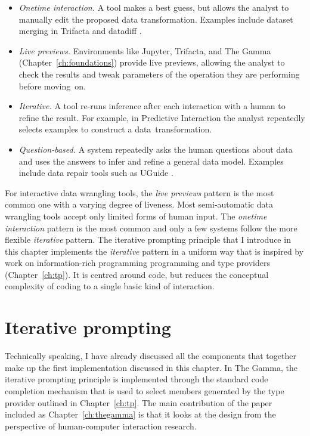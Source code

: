 \documentclass[fleqn,11pt]{report}
\theoremstyle{definition}
\newenvironment{nitemize}
{ \vspace{-0.4em}
  \begin{itemize}
    \setlength{\itemsep}{5pt}
    \setlength{\parskip}{0pt}
    \setlength{\parsep}{0pt} }
{ \end{itemize}
  \vspace{-0.4em} }
\begin{document}
\begin{nitemize}
\item \emph{Onetime interaction.} A tool makes a best guess, but allows the analyst to manually edit
the proposed data transformation. Examples include dataset merging
in Trifacta and datadiff \citep{sutton-2018-datadiff}.

\item \emph{Live previews.} Environments like Jupyter, Trifacta, and The Gamma
(Chapter~\ref{ch:foundations}) provide live previews, allowing the analyst to check the results and tweak
parameters of the operation they are performing before moving~on.

\item \emph{Iterative.} A tool re-runs inference after each interaction with a human
to refine the result. For example, in Predictive Interaction \citep{heer-2015-predictive}
the analyst repeatedly selects examples to construct a data~transformation.

\item \emph{Question-based.} A system repeatedly asks the human questions about data and uses the
answers to infer and refine a general data model. Examples include data repair tools such as UGuide
\citep{thirumuruganathan-2017-uguide}.
\end{nitemize}

For interactive data wrangling tools, the \emph{live previews} pattern is the most common one
with a varying degree of liveness. Most semi-automatic data wrangling tools accept only
limited forms of human input. The \emph{onetime interaction} pattern is the most common
and only a few systems follow the more flexible \emph{iterative} pattern. The iterative
prompting principle that I introduce in this chapter implements the \emph{iterative} pattern
in a uniform way that is inspired by work on information-rich programming programming
\citep{syme-2013-inforich} and type providers (Chapter~\ref{ch:tp}). It is centred around
code, but reduces the conceptual complexity of coding to a single basic kind of interaction.

\section{Iterative prompting}
Technically speaking, I have already discussed all the components that together make up
the first implementation discussed in this chapter. In The Gamma, the iterative prompting
principle is implemented through the standard code completion mechanism that is
used to select members generated by the type provider outlined in Chapter~\ref{ch:tp}.
The main contribution of the paper included as Chapter~\ref{ch:thegamma} is that it
looks at the design from the perspective of human-computer interaction research.
\end{document}
